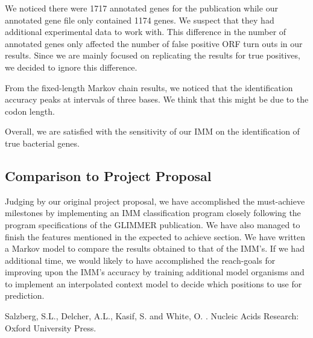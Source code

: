 \documentclass[11pt,letterpaper]{article}
\begin{document}
We noticed there were 1717 annotated genes for the publication while our annotated gene file only contained 1174 genes. We suspect that they had additional experimental data to work with. This difference in the number of annotated genes only affected the number of false positive ORF turn outs in our results. Since we are mainly focused on replicating the results for true positives, we decided to ignore this difference.

From the fixed-length Markov chain results, we noticed that the identification accuracy peaks at intervals of three bases. We think that this might be due to the codon length. 

Overall, we are satisfied with the sensitivity of our IMM on the identification of true bacterial genes.

\subsection{Comparison to Project Proposal}
Judging by our original project proposal, we have accomplished the must-achieve milestones by implementing an IMM classification program closely following the program specifications of the GLIMMER publication. We have also managed to finish the features mentioned in the expected to achieve section. We have written a Markov model to compare the results obtained to that of the IMM’s. If we had additional time, we would likely to have accomplished the reach-goals for improving upon the IMM’s accuracy by training additional model organisms and to implement an interpolated context model to decide which positions to use for prediction.


\begin{thebibliography}{}

Salzberg, S.L., Delcher, A.L., Kasif, S. and White, O.
.
\newblock Nucleic Acids Research: Oxford University Press.

\end{thebibliography}
\end{document}
